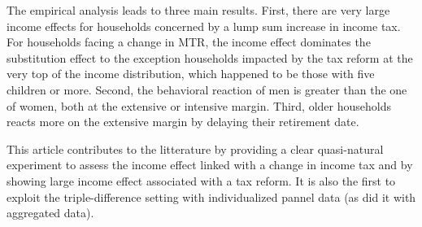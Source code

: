 
\medskip

The empirical analysis leads to three main results. First, there are very large income effects for households concerned by a lump sum increase in income tax. For households facing a change in MTR, the income effect dominates the substitution effect to the exception households impacted by the tax reform at the very top of the income distribution, which happened to be those with five children or more. Second, the behavioral reaction of men is greater than the one of women, both at the extensive or intensive margin. Third, older households reacts more on the extensive margin by delaying their retirement date.

This article contributes to the litterature by providing a clear quasi-natural experiment to assess the income effect linked with a change in income tax and by showing large income effect associated with a tax reform.  It is also the first to exploit the triple-difference setting with individualized pannel data (as \citet{piketty1999hauts} did it with aggregated data).






















